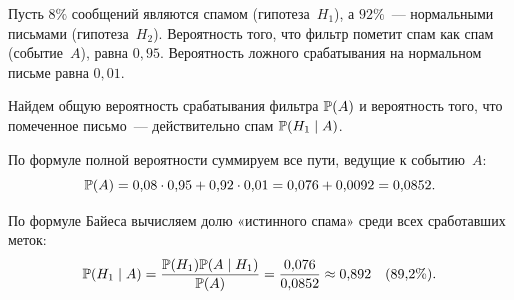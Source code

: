 \begin{example}
Пусть $8\%$ сообщений являются спамом (гипотеза~$H_1$), а $92\%$~--- нормальными письмами (гипотеза~$H_2$). Вероятность того, что фильтр пометит спам как спам (событие~$A$), равна $0{,}95$. Вероятность ложного срабатывания на нормальном письме равна $0{,}01$. 

Найдем общую вероятность срабатывания фильтра $\mathbb{P}(A)$ и вероятность того, что помеченное письмо~--- действительно спам $\mathbb{P}(H_1 \mid A)$.

\begin{center}
\end{center}

По формуле полной вероятности суммируем все пути, ведущие к событию~$A$:
\[
\mathbb{P}(A) = 0{,}08 \cdot 0{,}95 + 0{,}92 \cdot 0{,}01 = 0{,}076 + 0{,}0092 = 0{,}0852.
\]

По формуле Байеса вычисляем долю «истинного спама» среди всех сработавших меток:
\[
\mathbb{P}(H_1 \mid A) = \frac{\mathbb{P}(H_1)\mathbb{P}(A \mid H_1)}{\mathbb{P}(A)} = \frac{0{,}076}{0{,}0852} \approx 0{,}892 \quad (89{,}2\%).
\]
\end{example}